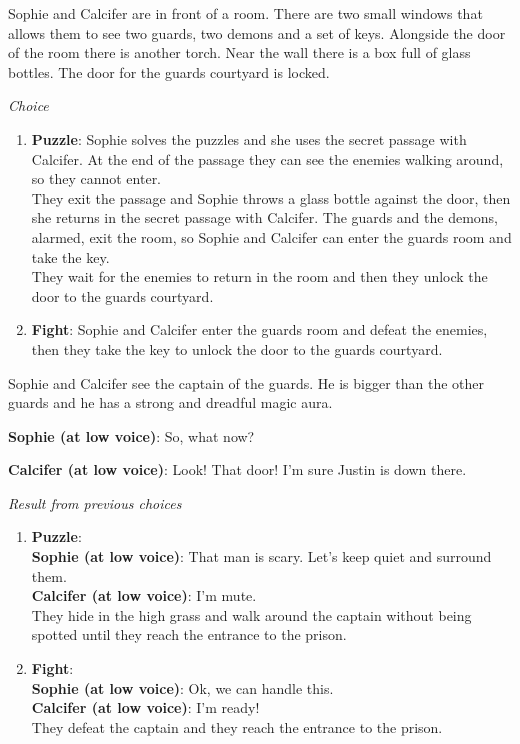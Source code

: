 
Sophie and Calcifer are in front of a room. There are two small windows that allows them to see two guards, two demons and a set of keys. Alongside the door of the room there is another torch. Near the wall there is a box full of glass bottles. The door for the guards courtyard is locked.

\textit{Choice}
\begin{enumerate}
  \item \textbf{Puzzle}: Sophie solves the puzzles and she uses the secret passage with Calcifer. At the end of the passage they can see the enemies walking around, so they cannot enter.\\
  They exit the passage and Sophie throws a glass bottle against the door, then she returns in the secret passage with Calcifer. The guards and the demons, alarmed, exit the room, so Sophie and Calcifer can enter the guards room and take the key.\\
  They wait for the enemies to return in the room and then they unlock the door to the guards courtyard.

  \item \textbf{Fight}: Sophie and Calcifer enter the guards room and defeat the enemies, then they take the key to unlock the door to the guards courtyard.
\end{enumerate}


Sophie and Calcifer see the captain of the guards. He is bigger than the other guards and he has a strong and dreadful magic aura.

\textbf{Sophie (at low voice)}: So, what now?

\textbf{Calcifer (at low voice)}: Look! That door! I'm sure Justin is down there.

\textit{Result from previous choices}
\begin{enumerate}
  \item \textbf{Puzzle}:\\
  \textbf{Sophie (at low voice)}: That man is scary. Let's keep quiet and surround them.\\
  \textbf{Calcifer (at low voice)}: I'm mute.\\
  They hide in the high grass and walk around the captain without being spotted until they reach the entrance to the prison.

  \item \textbf{Fight}:\\
  \textbf{Sophie (at low voice)}: Ok, we can handle this.\\
  \textbf{Calcifer (at low voice)}: I'm ready!\\
  They defeat the captain and they reach the entrance to the prison.
\end{enumerate}

